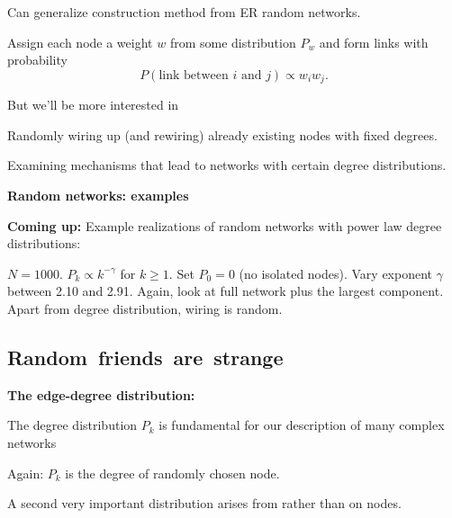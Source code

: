\begin{frame}[label=]
\begin{frame}[label=]
\begin{frame}[label=]
\begin{frame}[label=]
\begin{frame}[label=]
\begin{frame}[label=]
\begin{frame}[label=]
\begin{frame}[label=]
\begin{frame}[label=]
\begin{frame}[label=]
\begin{frame}[label=]
\begin{frame}[label=]
\begin{frame}[label=]
    Can generalize construction method from ER random networks.
  
    Assign each node a weight $w$ from some distribution $P_w$
    and form links with probability
    $$ P(\mbox{link between $i$ and $j$}) \propto w_i w_j.$$
  
    But we'll be more interested in 
    
    
      Randomly wiring up (and rewiring) already existing nodes
      with fixed degrees.
    
      Examining mechanisms that lead to networks with
      certain degree distributions.
    
  


\begin{frame}[label=]
  \textbf{Random networks: examples}

  \textbf{Coming up:}
    Example realizations of random networks with
    power law degree distributions:
    
     $N=1000$.
     $P_k \propto k^{-\gamma}$ for $k \ge 1$.
     Set $P_0 = 0$ (no isolated nodes).
     Vary exponent $\gamma$ between 2.10 and 2.91.
     Again, look at full network plus the largest component.
     Apart from degree distribution, wiring is random.
    
  



% 





\subsection{Random\ friends\ are\ strange}

\begin{frame}[label=]
  \textbf{The edge-degree distribution:}

  
   
    The degree distribution $P_k$ is fundamental for our description
    of many complex networks
   
    Again: $P_k$ is the degree of \alert{randomly chosen node}.
   
    A second very important distribution arises
    from  rather than on nodes.
  

\end{frame}
\end{frame}
\end{frame}
\end{frame}
\end{frame}
\end{frame}
\end{frame}
\end{frame}
\end{frame}
\end{frame}
\end{frame}
\end{frame}
\end{frame}
\end{frame}
\end{frame}
